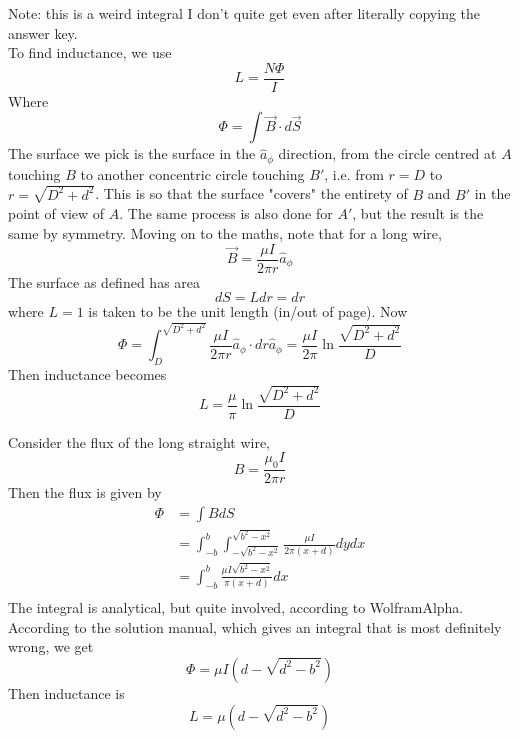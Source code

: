 \documentclass[answers]{exam}
\begin{document}
\begin{questions}
\begin{solution}
    Note: this is a weird integral I don't quite get even after literally copying the answer key. \\
    To find inductance, we use
    $$L = \frac{N\Phi}{I}$$
    Where
    $$\Phi = \int \vec B \cdot d\vec S$$
    The surface we pick is the surface in the $\hat a_\phi$ direction, from the circle centred at $A$ touching $B$ to another concentric circle touching $B'$, i.e. from $r=D$ to $r=\sqrt{D^2+d^2}$. This is so that the surface "covers" the entirety of $B$ and $B'$ in the point of view of $A$. The same process is also done for $A'$, but the result is the same by symmetry. Moving on to the maths, note that for a long wire,
    $$\vec B = \frac{\mu I}{2\pi r} \hat a_\phi$$
    The surface as defined has area
    $$dS = Ldr = dr$$
    where $L=1$ is taken to be the unit length (in/out of page). Now
    $$\Phi = \int_D^{\sqrt{D^2+d^2}} \frac{\mu I}{2\pi r}\hat a_\phi \cdot dr\hat a_\phi = \frac{\mu I}{2\pi} \ln\frac{\sqrt{D^2+d^2}}{D}$$
    Then inductance becomes
    $$L = \frac{\mu}{\pi} \ln\frac{\sqrt{D^2+d^2}}{D}$$
\end{solution}


\begin{solution}
    Consider the flux of the long straight wire,
    $$B = \frac{\mu_0 I}{2\pi r}$$
    Then the flux is given by
    \begin{align*}
        \Phi &= \int BdS \\
             &= \int_{-b}^b \int_{-\sqrt{b^2-x^2}}^{\sqrt{b^2-x^2}} \frac{\mu I}{2\pi(x+d)} dydx \\
             &= \int_{-b}^b \frac{\mu I\sqrt{b^2-x^2}}{\pi(x+d)} dx \\
    \end{align*}
    The integral is analytical, but quite involved, according to WolframAlpha. According to the solution manual, which gives an integral that is most definitely wrong, we get
    $$\Phi = \mu I(d-\sqrt{d^2-b^2})$$
    Then inductance is
    $$L = \mu(d-\sqrt{d^2-b^2})$$
\end{solution}



\end{questions}
\end{document}

